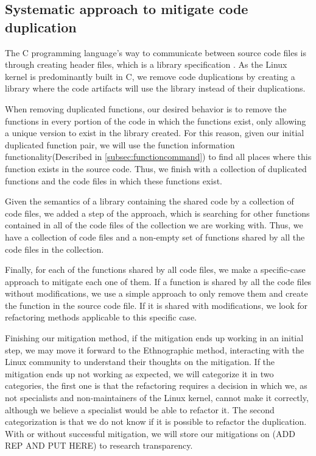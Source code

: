 \subsection{Systematic approach to mitigate code duplication}

\label{subsec:pipeline}

The C programming language’s way to communicate between source code files is through creating 
header files, which is a library specification \citep{Cbook}. As the Linux kernel 
is predominantly built in C, we remove code duplications by creating a library where the code 
artifacts will use the library instead of their duplications.

When removing duplicated functions, our desired behavior is to remove the functions in every 
portion of the code in which the functions exist, only allowing a unique version to exist in 
the library created. For this reason, given our initial duplicated function pair, we will use 
the function information functionality(Described in \ref{subsec:functioncommand}) to find all
places where this function exists in the source code. Thus, we finish with a collection of 
duplicated functions and the code files in which these functions exist.

Given the semantics of a library containing the shared code by a collection of code files, 
we added a step of the approach, which is searching for other functions contained in all of 
the code files of the collection we are working with. Thus, we have a collection of code files 
and a non-empty set of functions shared by all the code files in the collection.

Finally, for each of the functions shared by all code files, we make a specific-case approach 
to mitigate each one of them. If a function is shared by all the code files without 
modifications, we use a simple approach to only remove them and create the function in the 
source code file. If it is shared with modifications, we look for refactoring methods applicable 
to this specific case.

Finishing our mitigation method, if the mitigation ends up working in an initial step, we may 
move it forward to the Ethnographic method, interacting with the Linux community to understand 
their thoughts on the mitigation. If the mitigation ends up not working as expected, we will 
categorize it in two categories, the first one is that the refactoring requires a decision in 
which we, as not specialists and non-maintainers of the Linux kernel, cannot make it correctly,
although we believe a specialist would be able to refactor it. The second categorization is 
that we do not know if it is possible to refactor the duplication. With or without successful 
mitigation, we will store our mitigations on (ADD REP AND PUT HERE) to research transparency.

